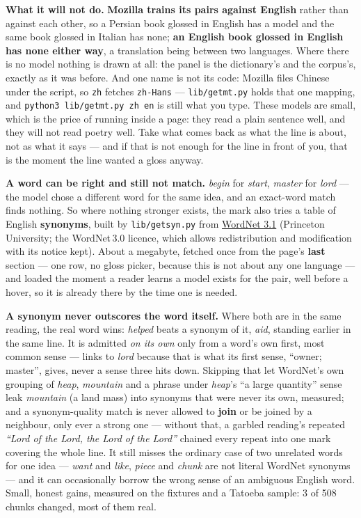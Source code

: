 \documentclass[11pt,oneside]{report}
\newcommand{\pw}[1]{\babelsublr{\mbox{\foreignlanguage{persian}{#1}}}}
\newcommand{\file}[1]{\texttt{#1}}
\begin{document}
\begin{warnbox}
\textbf{What it will not do.} \textbf{Mozilla trains its pairs against
English} rather than against each other, so a Persian book glossed in English
has a model and the same book glossed in Italian has none; \textbf{an English
book glossed in English has none either way}, a translation being between two
languages. Where there is no model nothing is drawn at all: the panel is the
dictionary's and the corpus's, exactly as it was before. And one name is not
its code: Mozilla files Chinese under the script, so \texttt{zh} fetches
\texttt{zh-Hans} --- \file{lib/getmt.py} holds that one mapping, and
\texttt{python3 lib/getmt.py zh en} is still what you type. These models
are small, which is the price of running inside a page: they read a plain
sentence well, and they will not read poetry well. Take what comes back as
what the line is about, not as what it says --- and if that is not enough for
the line in front of you, that is the moment the line wanted a gloss anyway.
\end{warnbox}

\textbf{A word can be right and still not match.} \emph{begin} for
\emph{start}, \emph{master} for \emph{lord} --- the model chose a different
word for the same
idea, and an exact-word match finds nothing. So where nothing stronger
exists, the mark also tries a table of English \textbf{synonyms}, built by
\file{lib/getsyn.py} from
\href{https://wordnet.princeton.edu/}{WordNet 3.1} (Princeton University;
the WordNet\,3.0 licence, which allows redistribution and modification with
its notice kept). About a megabyte, fetched once from the page's
\textbf{last} section --- one row, no gloss picker, because this is not
about any one language --- and loaded the moment a reader learns a model
exists for the pair, well before a hover, so it is already there by the
time one is needed.

\begin{warnbox}
\textbf{A synonym never outscores the word itself.} Where both are in the
same reading, the real word wins: \emph{helped} beats a synonym of it,
\emph{aid}, standing earlier in the same line. It is admitted \emph{on its
own} only from a word's own first, most common sense --- \pw{صاحب} links to
\emph{lord} because that is what its first sense, ``owner; master'', gives,
never a sense three hits down. Skipping that let WordNet's own grouping of
\emph{heap}, \emph{mountain} and a phrase under \emph{heap}'s ``a large
quantity'' sense leak \emph{mountain} (a land mass) into synonyms that were
never its own, measured; and a synonym-quality match is never allowed to
\textbf{join} or be joined by a neighbour, only ever a strong one --- without
that, a garbled reading's repeated \emph{``Lord of the Lord, the Lord of the
Lord''} chained every repeat into one mark covering the whole line. It still
misses the ordinary case of two unrelated words for one idea --- \emph{want}
and \emph{like}, \emph{piece} and \emph{chunk} are not literal WordNet synonyms
--- and it can occasionally borrow the wrong sense of an ambiguous English word.
Small, honest gains, measured on the fixtures and a Tatoeba sample: 3 of 508
chunks changed, most of them real.
\end{warnbox}
\end{document}
